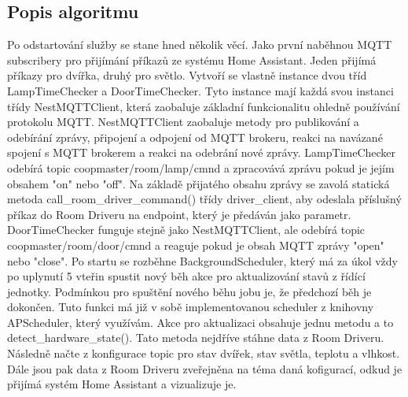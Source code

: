 \subsection*{Popis algoritmu}
Po odstartování služby se stane hned několik věcí.
Jako první naběhnou MQTT subscribery pro přijímání příkazů ze systému Home Assistant.
Jeden přijímá příkazy pro dvířka, druhý pro světlo.
Vytvoří se vlastně instance dvou tříd LampTimeChecker a DoorTimeChecker. \newline
Tyto instance mají každá svou instanci třídy NestMQTTClient, která zaobaluje základní funkcionalitu ohledně používání protokolu MQTT.
NestMQTTClient zaobaluje metody pro publikování a odebírání zprávy, připojení a odpojení od MQTT brokeru, reakci na navázané spojení s MQTT brokerem a reakci na odebrání nové zprávy.
LampTimeChecker odebírá topic coopmaster/room/lamp/cmnd  a zpracovává zprávu pokud je jejím obsahem "on" nebo "off".
Na základě přijatého obsahu zprávy se zavolá statická metoda call\_room\_driver\_command() třídy driver\_client, aby odeslala příslušný příkaz do Room Driveru na endpoint, který je předáván jako parametr.
DoorTimeChecker funguje stejně jako NestMQTTClient, ale odebírá topic coopmaster/room/door/cmnd  a reaguje pokud je obsah MQTT zprávy "open" nebo "close".\newline
Po startu se rozběhne BackgroundScheduler, který má za úkol vždy po uplynutí 5 vteřin spustit nový běh akce pro aktualizování stavů z řídící jednotky.
Podmínkou pro spuštění nového běhu jobu je, že předchozí běh je dokončen.
Tuto funkci má již v sobě implementovanou scheduler z knihovny APScheduler, který využívám.
Akce pro aktualizaci obsahuje jednu metodu a to detect\_hardware\_state().
Tato metoda nejdříve stáhne data z Room Driveru.
Následně načte z konfigurace topic pro stav dvířek, stav světla, teplotu a vlhkost.
Dále jsou pak data z Room Driveru zveřejněna na téma daná kofigurací, odkud je přijímá systém Home Assistant a vizualizuje je.

